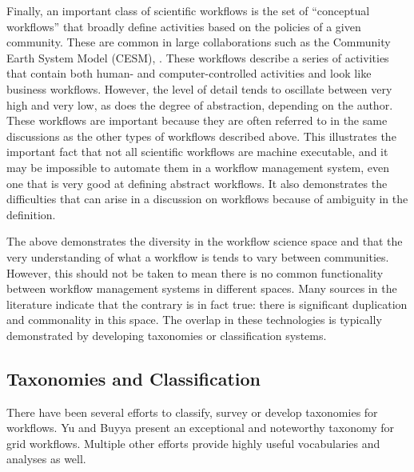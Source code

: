 Finally, an important class of scientific workflows is the set of ``conceptual workflows'' that broadly define activities based on the policies of a given community. These are common in large collaborations such as the Community Earth System Model (CESM), \cite{noauthor_cesm_nodate}. These workflows describe a series of activities that contain both human- and computer-controlled activities and look like business workflows. However, the level of detail tends to oscillate between very high and very low, as does the degree of abstraction, depending on the author. These workflows are important because they are often referred to in the same discussions as the other types of workflows described above. This illustrates the important fact that not all scientific workflows are machine executable, and it may be impossible to automate them in a workflow management system, even one that is very good at defining abstract workflows. It also demonstrates the difficulties that can arise in a discussion on workflows because of ambiguity in the definition.

The above demonstrates the diversity in the workflow science space and that the very understanding of what a workflow is tends to vary between communities. However, this should not be taken to mean there is no common functionality between workflow management systems in different spaces. Many sources in the literature indicate that the contrary is in fact true: there is significant duplication and commonality in this space. The overlap in these technologies is typically demonstrated by developing taxonomies or classification systems.

\subsection{Taxonomies and
Classification}\label{taxonomies-and-classification}
There have been several efforts to classify, survey or develop taxonomies
for workflows. Yu and Buyya present an exceptional and noteworthy taxonomy for grid
workflows. Multiple other efforts provide highly useful vocabularies and analyses as
well.


